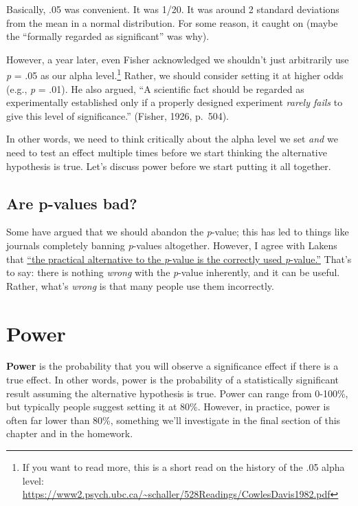 \documentclass[
]{book}
\begin{document}
Basically, .05 was convenient. It was 1/20. It was around 2 standard deviations from the mean in a normal distribution. For some reason, it caught on (maybe the ``formally regarded as significant'' was why).

However, a year later, even Fisher acknowledged we shouldn't just arbitrarily use \emph{p} = .05 as our alpha level.\footnote{If you want to read more, this is a short read on the history of the .05 alpha level: \url{https://www2.psych.ubc.ca/~schaller/528Readings/CowlesDavis1982.pdf}} Rather, we should consider setting it at higher odds (e.g., \emph{p} = .01). He also argued, ``A scientific fact should be regarded as experimentally established only if a properly designed experiment \emph{rarely fails} to give this level of significance.'' (Fisher, 1926, p.~504).

In other words, we need to think critically about the alpha level we set \emph{and} we need to test an effect multiple times before we start thinking the alternative hypothesis is true. Let's discuss power before we start putting it all together.

\hypertarget{are-p-values-bad}{%
\subsection{Are p-values bad?}\label{are-p-values-bad}}

Some have argued that we should abandon the \emph{p}-value; this has led to things like journals completely banning \emph{p}-values altogether. However, I agree with Lakens that \href{https://psyarxiv.com/shm8v/}{``the practical alternative to the \emph{p}-value is the correctly used \emph{p}-value.''} That's to say: there is nothing \emph{wrong} with the \emph{p}-value inherently, and it can be useful. Rather, what's \emph{wrong} is that many people use them incorrectly.

\hypertarget{power}{%
\section{Power}\label{power}}

\textbf{Power} is the probability that you will observe a significance effect if there is a true effect. In other words, power is the probability of a statistically significant result assuming the alternative hypothesis is true. Power can range from 0-100\%, but typically people suggest setting it at 80\%. However, in practice, power is often far lower than 80\%, something we'll investigate in the final section of this chapter and in the homework.
\end{document}
